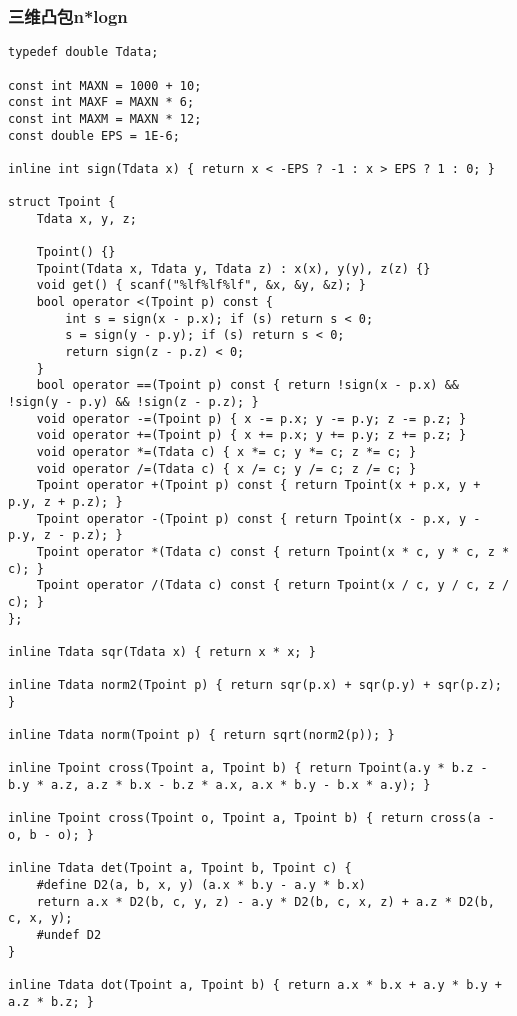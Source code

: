 \subsubsection{三维凸包n*logn}
\begin{verbatim}
typedef double Tdata;

const int MAXN = 1000 + 10;
const int MAXF = MAXN * 6;
const int MAXM = MAXN * 12;
const double EPS = 1E-6;

inline int sign(Tdata x) { return x < -EPS ? -1 : x > EPS ? 1 : 0; }

struct Tpoint {
    Tdata x, y, z;
    
    Tpoint() {}
    Tpoint(Tdata x, Tdata y, Tdata z) : x(x), y(y), z(z) {}
    void get() { scanf("%lf%lf%lf", &x, &y, &z); }
    bool operator <(Tpoint p) const {
        int s = sign(x - p.x); if (s) return s < 0;
        s = sign(y - p.y); if (s) return s < 0;
        return sign(z - p.z) < 0;
    }
    bool operator ==(Tpoint p) const { return !sign(x - p.x) && !sign(y - p.y) && !sign(z - p.z); }
    void operator -=(Tpoint p) { x -= p.x; y -= p.y; z -= p.z; }
    void operator +=(Tpoint p) { x += p.x; y += p.y; z += p.z; }
    void operator *=(Tdata c) { x *= c; y *= c; z *= c; }
    void operator /=(Tdata c) { x /= c; y /= c; z /= c; }
    Tpoint operator +(Tpoint p) const { return Tpoint(x + p.x, y + p.y, z + p.z); }
    Tpoint operator -(Tpoint p) const { return Tpoint(x - p.x, y - p.y, z - p.z); }
    Tpoint operator *(Tdata c) const { return Tpoint(x * c, y * c, z * c); }
    Tpoint operator /(Tdata c) const { return Tpoint(x / c, y / c, z / c); }
};

inline Tdata sqr(Tdata x) { return x * x; }

inline Tdata norm2(Tpoint p) { return sqr(p.x) + sqr(p.y) + sqr(p.z); }

inline Tdata norm(Tpoint p) { return sqrt(norm2(p)); }

inline Tpoint cross(Tpoint a, Tpoint b) { return Tpoint(a.y * b.z - b.y * a.z, a.z * b.x - b.z * a.x, a.x * b.y - b.x * a.y); }

inline Tpoint cross(Tpoint o, Tpoint a, Tpoint b) { return cross(a - o, b - o); }

inline Tdata det(Tpoint a, Tpoint b, Tpoint c) {
    #define D2(a, b, x, y) (a.x * b.y - a.y * b.x)
    return a.x * D2(b, c, y, z) - a.y * D2(b, c, x, z) + a.z * D2(b, c, x, y);
    #undef D2
}

inline Tdata dot(Tpoint a, Tpoint b) { return a.x * b.x + a.y * b.y + a.z * b.z; }


\end{verbatim}
